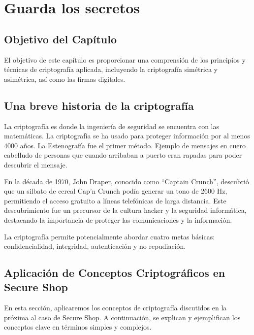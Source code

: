 \chapter{Guarda los secretos}
\vspace{95px}
\begin{flushright}
    \textit{ }
\end{flushright}

\vspace{100px}

\section{Objetivo del Capítulo}
El objetivo de este capítulo es proporcionar una comprensión de los principios y técnicas de criptografía aplicada, incluyendo la criptografía simétrica y asimétrica, así como las firmas digitales.
\section{Una breve historia de la criptografía}

La criptografía es donde la ingeniería de seguridad se encuentra con las matemáticas. 
La criptografía se ha usado para proteger información por al menos 4000 años. La Estenografía fue el primer método. Ejemplo de mensajes en cuero cabelludo de personas que cuando arribaban a puerto eran rapadas para poder descubrir el mensaje.  



En la década de 1970, John Draper, conocido como ``Captain Crunch'', descubrió que un silbato de cereal Cap'n Crunch podía generar un tono de 2600 Hz, permitiendo el acceso gratuito a líneas telefónicas de larga distancia. Este descubrimiento fue un precursor de la cultura hacker y la seguridad informática, destacando la importancia de proteger las comunicaciones y la información.



La criptografía permite potencialmente abordar cuatro metas básicas: confidencialidad, integridad, autenticación y no repudiación.

\section{Aplicación de Conceptos Criptográficos en Secure Shop}

En esta sección, aplicaremos los conceptos de criptografía discutidos en la próxima al caso de Secure Shop. A continuación, se explican y ejemplifican los conceptos clave en términos simples y complejos.

